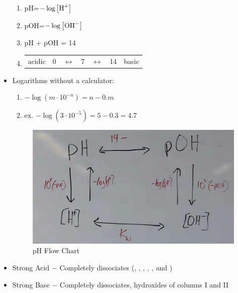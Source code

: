 \documentclass[12pt]{article}
\begin{document}
\begin{itemize}
\begin{enumerate}
      \item pH=$-\log\left[ \ce{H+} \right]$

      \item pOH=$-\log\left[ \ce{OH-} \right]$

      \item pH + pOH = 14

      \item \begin{tabular}[H]{c c c c c c c}
          acidic & 0 & $\leftrightarrow$ & 7 & $\leftrightarrow$ & 14 & basic
        \end{tabular}

    \end{enumerate}

  \item Logarithms without a calculator:

    \begin{enumerate}

      \item $-\log\left( m\cdot10^{-n} \right)=n-0.m$

      \item ex. $-\log\left( 3\cdot10^{-5} \right)=5-0.3=4.7$

    \end{enumerate}

    \begin{center}
    \begin{figure}[H]
      \centering
      \includegraphics[width=.7\textwidth]{Figures/pHflow.png}
      \caption{pH Flow Chart}
      \label{fig:1}
    \end{figure}
  \end{center}

\item Strong Acid $-$ Completely dissociates (, , , , , and )

\item Strong Base $-$ Completely dissociates, hydroxides of columns I and II


\end{itemize}
\end{document}
